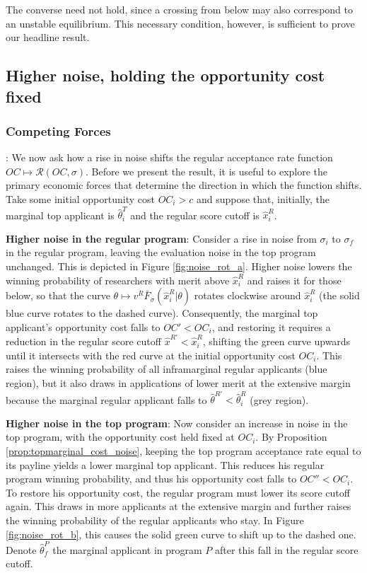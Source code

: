 \documentclass[12pt,reqno]{amsart}
\theoremstyle{definition}
\theoremstyle{plain} %
\begin{document}
\noindent The converse need not hold, since a crossing from below may also correspond to an unstable equilibrium. This necessary condition, however, is sufficient to prove our headline result.

\subsection{Higher noise, holding the opportunity cost fixed}

\subsubsection{Competing Forces}\label{section:competing_forces}: We now ask how a rise in noise shifts the regular acceptance rate function $OC\mapsto \mathcal{R}(OC,\sigma)$. Before we present the result, it is useful to explore the primary economic forces that determine the direction in which the function shifts. Take some initial opportunity cost $OC_i>c$ and suppose that, initially, the marginal top applicant is $\hat{\theta}^T_{i}$ and the regular score cutoff is $\hat{x}^R_i$. 

\noindent \textbf{Higher noise in the regular program}: Consider a rise in noise from $\sigma_i$ to $\sigma_f$ in the regular program, leaving the evaluation noise in the top program unchanged. This is depicted in Figure \ref{fig:noise_rot_a}. Higher noise lowers the winning probability of researchers with merit above $\hat{x}^R_i$ and raises it for those below, so that the curve $\theta\mapsto v^R\bar{F}_{\sigma}(\hat{x}^R_i|\theta)$ rotates clockwise around $\hat{x}^R_i$ (the solid blue curve rotates to the dashed curve). Consequently, the marginal top applicant's opportunity cost falls to $OC'<OC_i$, and restoring it requires a reduction in the regular score cutoff $\hat{x}^{R'}<\hat{x}^R_i$, shifting the green curve upwards until it intersects with the red curve at the initial opportunity cost $OC_i$. This raises the winning probability of all inframarginal regular applicants (blue region), but it also draws in applications of lower merit at the extensive margin because the marginal regular applicant falls to $\hat{\theta}^{R'}<\hat{\theta}^R_i$ (grey region). 



% 

\noindent \textbf{Higher noise in the top program}: Now consider an increase in noise in the top program, with the opportunity cost held fixed at $OC_i$. By Proposition \ref{prop:topmarginal_cost_noise}, keeping the top program acceptance rate equal to its payline yields a lower marginal top applicant. This reduces his regular program winning probability, and thus his opportunity cost falls to $OC''<OC_i$. To restore his opportunity cost, the regular program must lower its score cutoff again. This draws in more applicants at the extensive margin and further raises the winning probability of the regular applicants who stay. In Figure \ref{fig:noise_rot_b}, this causes the solid green curve to shift up to the dashed one. Denote $\hat{\theta}^P_f$ the marginal applicant in program $P$ after this fall in the regular score cutoff. 
\end{document}
